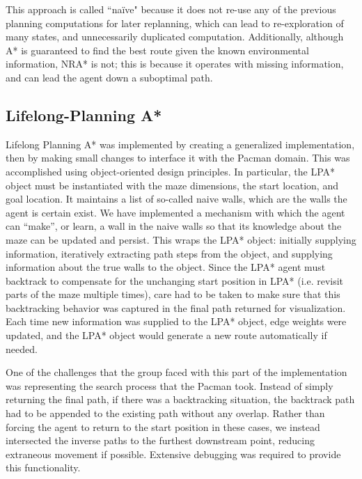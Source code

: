 	This approach is called ``naïve" because it does not re-use any of the previous planning computations for later replanning, which can lead to re-exploration of many states, and unnecessarily duplicated computation. Additionally, although A* is guaranteed to find the best route given the known environmental information, NRA* is not; this is because it operates with missing information, and can lead the agent down a suboptimal path.
	

\subsection{Lifelong-Planning A*}
	Lifelong Planning A* was implemented by creating a generalized implementation, then by making small changes to interface it with the Pacman domain. This was accomplished using object-oriented design principles. In particular, the LPA* object must be instantiated with the maze dimensions, the start location, and goal location. It maintains a list of so-called naive walls, which are the walls the agent is certain exist. We have implemented a mechanism with which the agent can ``make'', or learn, a wall in the naive walls so that its knowledge about the maze can be updated and persist. This wraps the LPA* object: initially supplying information, iteratively extracting path steps from the object, and supplying information about the true walls to the object. Since the LPA* agent must backtrack to compensate for the unchanging start position in LPA* (i.e. revisit parts of the maze multiple times), care had to be taken to make sure that this backtracking behavior was captured in the final path returned for visualization. Each time new information was supplied to the LPA* object, edge weights were updated, and the LPA* object would generate a new route automatically if needed.
	
	One of the challenges that the group faced with this part of the implementation was representing the search process that the Pacman took. Instead of simply returning the final path, if there was a backtracking situation, the backtrack path had to be appended to the existing path without any overlap. Rather than forcing the agent to return to the start position in these cases, we instead intersected the inverse paths to the furthest downstream point, reducing extraneous movement if possible. Extensive debugging was required to provide this functionality.
	
